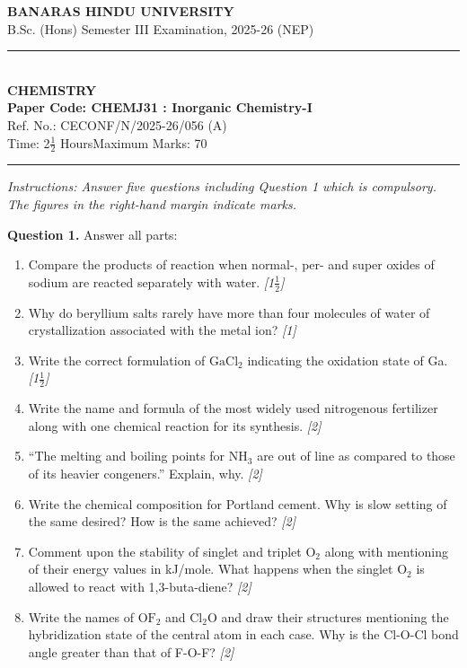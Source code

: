\documentclass[11pt,a4paper]{article}
\newcommand{\pts}[1]{\hfill \textit{[#1]}}
\begin{document}
\begin{center}
  {\large\bfseries BANARAS HINDU UNIVERSITY}\\[2pt]
  {\normalsize B.Sc. (Hons) Semester III Examination, 2025-26 (NEP)}\\[6pt]
  \rule{0.8\linewidth}{0.5pt}\\[6pt]
  {\large\bfseries CHEMISTRY}\\[4pt]
  {\large\bfseries Paper Code: CHEMJ31 : Inorganic Chemistry-I}\\[2pt]
  {\small Ref. No.: CECONF/N/2025-26/056 (A)}\\[4pt]
  {\normalsize Time: 2$\frac{1}{2}$ Hours\hfill Maximum Marks: 70}
\end{center}

\rule{\linewidth}{0.4pt}

\smallskip

\noindent \textit{Instructions: Answer five questions including Question 1 which is compulsory. The figures in the right-hand margin indicate marks.}

\bigskip

\noindent \textbf{Question 1.} Answer all parts:
\begin{enumerate}[label=(\alph*)]
  \item Compare the products of reaction when normal-, per- and super oxides of sodium are reacted separately with water. \pts{1$\frac{1}{2}$}
  \item Why do beryllium salts rarely have more than four molecules of water of crystallization associated with the metal ion? \pts{1}
  \item Write the correct formulation of $\text{GaCl}_2$ indicating the oxidation state of Ga. \pts{1$\frac{1}{2}$}
  \item Write the name and formula of the most widely used nitrogenous fertilizer along with one chemical reaction for its synthesis. \pts{2}
  \item ``The melting and boiling points for $\text{NH}_3$ are out of line as compared to those of its heavier congeners.'' Explain, why. \pts{2}
  \item Write the chemical composition for Portland cement. Why is slow setting of the same desired? How is the same achieved? \pts{2}
  \item Comment upon the stability of singlet and triplet $\text{O}_2$ along with mentioning of their energy values in kJ/mole. What happens when the singlet $\text{O}_2$ is allowed to react with 1,3-buta-diene? \pts{2}
  \item Write the names of $\text{OF}_2$ and $\text{Cl}_2\text{O}$ and draw their structures mentioning the hybridization state of the central atom in each case. Why is the Cl-O-Cl bond angle greater than that of F-O-F? \pts{2}
\end{enumerate}
\end{document}
